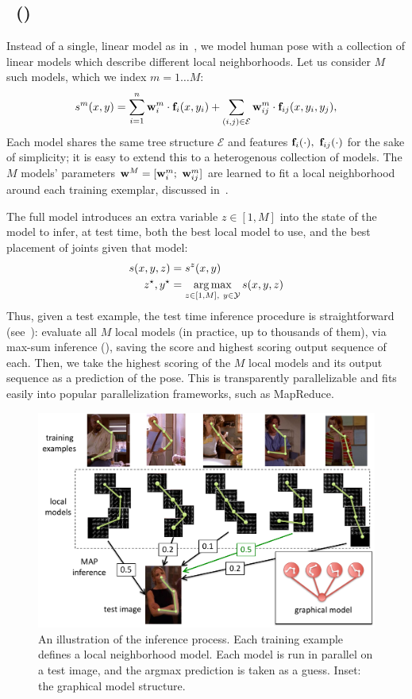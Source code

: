 \subsection{\LLPSlong~(\LLPS)}
Instead of a single, linear model as in~, we model human pose 
with a collection of linear models which describe different local 
neighborhoods.  Let us consider $M$ such models, which we index $m = 1 \ldots 
M$:
\begin{align}
s^m(x,y) = \sum_{i=1}^n \mathbf{w}^m_i \cdot \mathbf{f}_i(x,y_i) + \sum_{(i,j) \in \mathcal{E}} 
\mathbf{w}^m_{ij} \cdot \mathbf{f}_{ij}(x,y_i,y_j),
\end{align}
Each model shares the same tree structure $\mathcal{E}$ and features 
$\mathbf{f}_i(\cdot),~\mathbf{f}_{ij}(\cdot)$ for the sake of simplicity; it is easy to extend 
this to a heterogenous collection of models.  The $M$ models' parameters $\mathbf{w}^M 
= [\mathbf{w}^m_i;~\mathbf{w}^m_{ij}]$ are learned to fit a local neighborhood around each 
training exemplar, discussed in~.

The full \LLPS model introduces an extra variable $z \in [1,M]$ into the state 
of the model to infer, at test time, both the best local model to use, and the 
best placement of joints given that model:
\begin{align}
s(x,y,z) &= s^z(x,y) \\
z^\star,y^\star &= \mathop{\arg\max}_{z \in [1,M],~y \in \mathcal{Y}} s(x,y,z) 
\end{align}
Thus, given a test example, the test time inference procedure is 
straightforward (see~): evaluate all $M$ local models 
(in practice, up to thousands of them), via max-sum inference 
(), saving the score and highest scoring output sequence of 
each.  Then, we take the highest scoring of the $M$ local models and its output 
sequence as a prediction of the pose.  This is transparently parallelizable and 
fits easily into popular parallelization frameworks, such as MapReduce.

\begin{figure}[tb!]
\centering
\includegraphics[width=0.99\linewidth]{figs/llps-inference.pdf}
\caption[LLPS inference.]{\label{fig:llps-inference} An illustration of the 
inference process.  Each training example defines a local neighborhood model.  
Each model is run in parallel on a test image, and the argmax prediction is 
taken as a guess. Inset: the graphical model structure.}
\end{figure}

